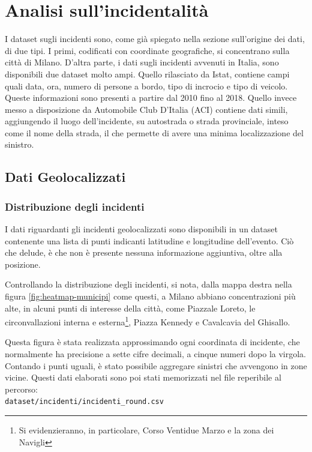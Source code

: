 \documentclass[a4paper]{report}
\newcommand{\filenamestyle}[1]{\texttt{#1}}
\begin{document}

\chapter{Analisi sull'incidentalità}

I dataset sugli incidenti sono, come già spiegato nella sezione sull'origine dei dati, 
di due tipi. 
I primi, codificati con coordinate geografiche, si concentrano sulla città di Milano. 
D'altra parte, i dati sugli incidenti avvenuti in Italia, 
sono disponibili due dataset molto ampi. 
Quello rilasciato da Istat, contiene campi quali data, ora, 
numero di persone a bordo, tipo di incrocio e tipo di veicolo. 
Queste informazioni sono presenti a partire dal 2010 fino al 2018. 
Quello invece messo a disposizione da Automobile Club D'Italia (ACI) 
contiene dati simili, 
aggiungendo il luogo dell'incidente, su autostrada o strada provinciale, 
inteso come il nome della strada, il che permette di avere una minima localizzazione del 
sinistro. 

\section{Dati Geolocalizzati}

\subsection{Distribuzione degli incidenti}

I dati riguardanti gli incidenti geolocalizzati sono disponibili in un dataset 
contenente una lista di punti indicanti latitudine e longitudine dell'evento. 
Ciò che delude, è che non è presente nessuna informazione aggiuntiva, 
oltre alla posizione. 

Controllando la distribuzione degli incidenti, 
si nota, dalla mappa destra nella figura \ref{fig:heatmap-municipi} come questi, 
a Milano abbiano concentrazioni più alte, 
in alcuni punti di interesse della città, come Piazzale Loreto, le circonvallazioni 
interna e esterna\footnote{Si evidenzieranno, in particolare, Corso Ventidue Marzo 
e la zona dei Navigli}, Piazza Kennedy e Cavalcavia del Ghisallo. 

Questa figura è stata realizzata approssimando ogni coordinata di incidente, che  
normalmente ha precisione a sette cifre decimali, a cinque numeri dopo la virgola. 
Contando i punti uguali, è stato possibile aggregare sinistri che avvengono in zone 
vicine. 
Questi dati elaborati sono poi stati memorizzati nel file reperibile al 
percorso:\\ 
\filenamestyle{dataset/incidenti/incidenti\_round.csv} 
\end{document}

